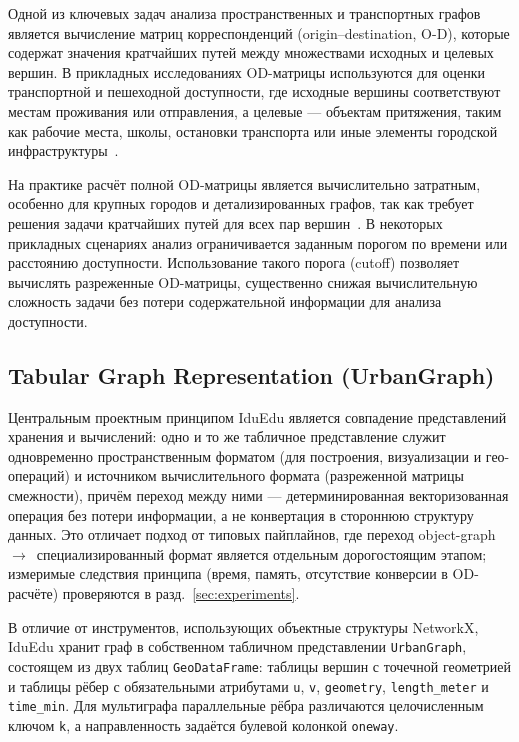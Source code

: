 \documentclass[sigconf,nonacm]{acmart}
\begin{document}
    Одной из ключевых задач анализа пространственных и транспортных графов является вычисление матриц корреспонденций (origin–destination, O-D),
    которые содержат значения кратчайших путей между множествами исходных и целевых вершин.
    В прикладных исследованиях OD-матрицы используются для оценки транспортной и пешеходной доступности, где исходные вершины
    соответствуют местам проживания или отправления, а целевые — объектам притяжения, таким как рабочие места, школы, остановки
    транспорта или иные элементы городской инфраструктуры~\cite{foti2014pandana, liu2022accessibility}.

    На практике расчёт полной OD-матрицы является вычислительно затратным, особенно для крупных городов и детализированных графов,
    так как требует решения задачи кратчайших путей для всех пар вершин~\cite{kwan1998accessibility}.
    В некоторых прикладных сценариях анализ ограничивается заданным порогом по времени или расстоянию доступности.
    Использование такого порога (cutoff) позволяет вычислять разреженные OD-матрицы, существенно снижая вычислительную сложность
    задачи без потери содержательной информации для анализа доступности.

    \subsection{Tabular Graph Representation (UrbanGraph)}
    \label{subsec:urban_graph}

    Центральным проектным принципом IduEdu является совпадение представлений хранения и вычислений:
    одно и то же табличное представление служит одновременно пространственным форматом (для построения, визуализации и
    гео-операций) и источником вычислительного формата (разреженной матрицы смежности), причём переход между ними —
    детерминированная векторизованная операция без потери информации, а не конвертация в стороннюю структуру данных.
    Это отличает подход от типовых пайплайнов, где переход object-graph~$\to$~специализированный формат является
    отдельным дорогостоящим этапом; измеримые следствия принципа (время, память, отсутствие конверсии в OD-расчёте)
    проверяются в разд.~\ref{sec:experiments}.

    В отличие от инструментов, использующих объектные структуры NetworkX, IduEdu хранит граф в собственном табличном представлении
    \texttt{UrbanGraph}, состоящем из двух таблиц \texttt{GeoDataFrame}: таблицы вершин с точечной геометрией и таблицы рёбер с
    обязательными атрибутами \texttt{u}, \texttt{v}, \texttt{geometry}, \texttt{length\_meter} и \texttt{time\_min}.
    Для мультиграфа параллельные рёбра различаются целочисленным ключом \texttt{k}, а направленность задаётся булевой колонкой \texttt{oneway}.
\end{document}
